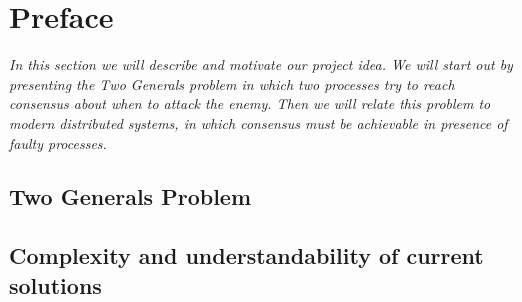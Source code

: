 \section{Preface} %
\label{sec:preface}

\textit{In this section we will describe and motivate our project idea. We will start out by presenting the Two Generals problem in which two processes try to reach consensus about when to attack the enemy. Then we will relate this problem to modern distributed systems, in which consensus must be achievable in presence of faulty processes.}

\subsection{Two Generals Problem}

\subsection{Complexity and understandability of current solutions}




